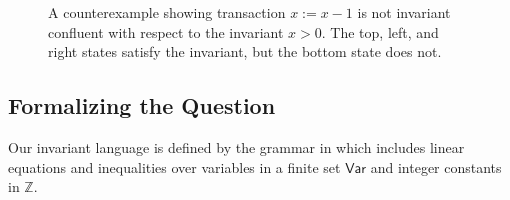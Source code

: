 \begin{figure}[h]
  \centering
  \caption{
    A counterexample showing transaction $x := x - 1$ is not invariant
    confluent with respect to the invariant $x > 0$. The top, left, and right
    states satisfy the invariant, but the bottom state does not.
  }
  \label{fig:decrement}
\end{figure}

\subsection{Formalizing the Question}\label{sec:counter-question}
\newcommand{\var}{\textsf{Var}}
\newcommand{\ints}{\mathbb{Z}}

Our invariant language is defined by the grammar in 
which includes linear equations and inequalities over variables in a finite set
$\var$ and integer constants in $\ints$.

